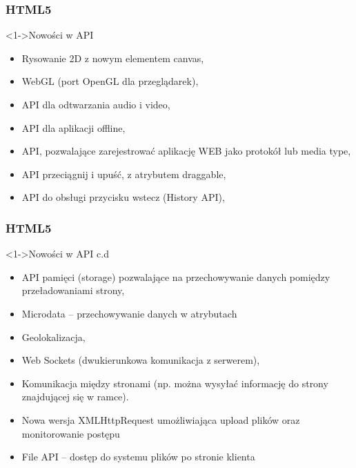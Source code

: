 \documentclass{beamer}
\begin{document}
\begin{frame}
\frametitle{HTML5}

\begin{block}<1->{Nowości w API}
\begin{itemize}
\item Rysowanie 2D z nowym elementem canvas,
\item  WebGL (port OpenGL dla przeglądarek),
\item  API dla odtwarzania audio i video,
\item  API dla aplikacji offline,
\item  API, pozwalające zarejestrować aplikację WEB jako protokół lub media type,
\item  API przeciągnij i upuść, z atrybutem draggable,
\item  API do obsługi przycisku wstecz (History API),

\end{itemize}
\end{block}
\end{frame}

\begin{frame}
\frametitle{HTML5}

\begin{block}<1->{Nowości w API c.d}
\begin{itemize}
\item  API pamięci (storage) pozwalające na przechowywanie danych pomiędzy przeładowaniami strony,
\item  Microdata – przechowywanie danych w atrybutach
\item  Geolokalizacja,
\item  Web Sockets (dwukierunkowa komunikacja z serwerem),
\item  Komunikacja między stronami (np. można wysyłać informację do strony znajdującej się w ramce).
\item  Nowa wersja XMLHttpRequest umożliwiająca upload plików oraz monitorowanie postępu
\item  File API – dostęp do systemu plików po stronie klienta
\end{itemize}
\end{block}
\end{frame}

\end{document}

